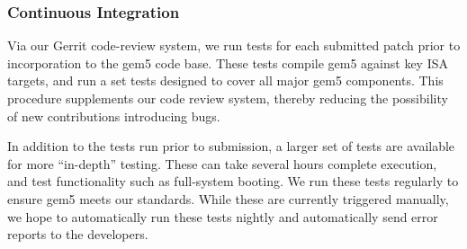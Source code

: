 \subsubsection{Continuous Integration}

Via our Gerrit code-review system, we run tests for each
submitted patch prior to incorporation to the gem5 code base. These tests
compile gem5 against key ISA targets, and run a set tests designed to cover all
major gem5 components. This procedure supplements our code review system, thereby
reducing the possibility of new contributions introducing bugs.

In addition to the tests run prior to submission, a larger set of tests are
available for more ``in-depth'' testing. These can take several hours complete
execution, and  test functionality such as
full-system booting. We run these tests regularly to ensure gem5 meets our
standards. While these are currently triggered manually, we hope to
automatically run these tests nightly and automatically send error reports to
the developers.
